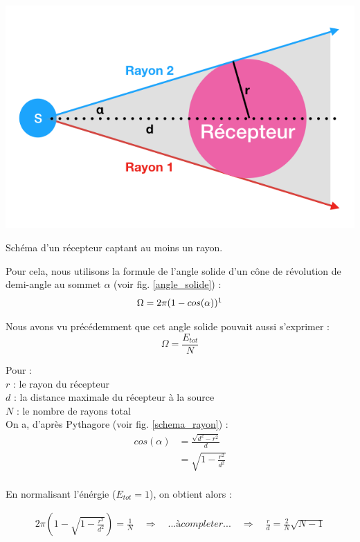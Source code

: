 \begin{figureth}
	\includegraphics[width=0.8\linewidth]{images/schema_rayon}
	\caption{Schéma d'un récepteur captant au moins un rayon.}
	\label{schema_rayon}
\end{figureth}

Pour cela, nous utilisons la formule de l'angle solide d'un cône de révolution de demi-angle au sommet $\alpha$ (voir fig. \ref{angle_solide}) :
\begin{equation}
	\Omega = 2\pi(1-cos(\alpha)) \footnotemark
\end{equation}

Nous avons vu précédemment que cet angle solide pouvait aussi s'exprimer :
\begin{equation}
	\Omega = \frac{E_{tot}}{N}
\end{equation}

Pour : \\
$r$ : le rayon du récepteur \\
$d$ : la distance maximale du récepteur à la source \\
$N$ : le nombre de rayons total \\

On a, d'après Pythagore (voir fig. \ref{schema_rayon}) :
\begin{align}
	cos(\alpha) & =  \frac{\sqrt{d^2-r^2}}{d}  \\
	& =  \sqrt{1-\frac{r^2}{d^2}} \\
\end{align}

En normalisant l'énérgie ($E_{tot} = 1$), on obtient alors :

\begin{align} 
	2\pi(1-\sqrt{1-\frac{r^2}{d^2}}) = \frac{1}{N} %
	 \quad \Rightarrow  \quad %
	 ... à completer ... %
	 \quad \Rightarrow  \quad %
	 \frac{r}{d} =  \frac{2}{N} \sqrt{N-1} \label{seuil_arret}
\end{align}


